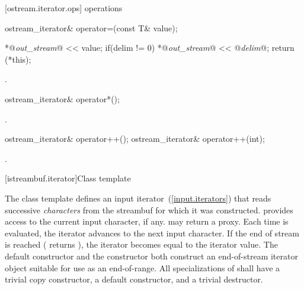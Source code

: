 [ostream.iterator.ops]{ operations}

%
%
\begin{itemdecl}
ostream_iterator& operator=(const T& value);
\end{itemdecl}

\begin{itemdescr}
\pnum
\effects
\begin{codeblock}
*@\textit{out_stream}@ << value;
if(delim != 0)
  *@\textit{out_stream}@ << @\textit{delim}@;
return (*this);
\end{codeblock}

\begin{addedblock}
\pnum
\requires {}.
\end{addedblock}
\end{itemdescr}

%
%
\begin{itemdecl}
ostream_iterator& operator*();
\end{itemdecl}

\begin{itemdescr}
\pnum
\returns
{}.
\end{itemdescr}

%
%
\begin{itemdecl}
ostream_iterator& operator++();
ostream_iterator& operator++(int);
\end{itemdecl}

\begin{itemdescr}
\pnum
\returns
{}.
\end{itemdescr}

[istreambuf.iterator]{Class template }

\pnum
The
class template
defines an input iterator~(\ref{input.iterators}) that
reads successive
\textit{characters}
from the streambuf for which it was constructed.
provides access to the current input character, if any.
\enternote {} may return a proxy. \exitnote
Each time
is evaluated, the iterator advances to the next input character.
If the end of stream is reached ( returns
),
the iterator becomes equal to the
iterator value.
The default constructor
and the constructor
both construct an end-of-stream iterator object suitable for use
as an end-of-range.
All specializations of  shall have a trivial copy
constructor, a  default constructor, and a trivial destructor.


